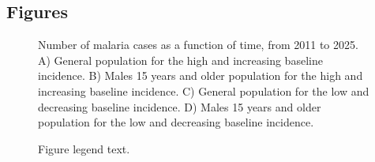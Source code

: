 \documentclass[doublespacing]{bmcart}
\begin{document}
\begin{backmatter}



\section*{Figures}
  \begin{figure}[h!]
  \caption{
      Number of malaria cases as a function of time, from 2011 to 2025. A) General population for the high and increasing baseline incidence. B) Males 15 years and older population for the high and increasing baseline incidence. C) General population for the low and decreasing baseline incidence. D) Males 15 years and older population for the low and decreasing baseline incidence. }
      \end{figure}

\begin{figure}[h!]
  \caption{
      Figure legend text.}
      \end{figure}



\end{backmatter}
\end{document}

